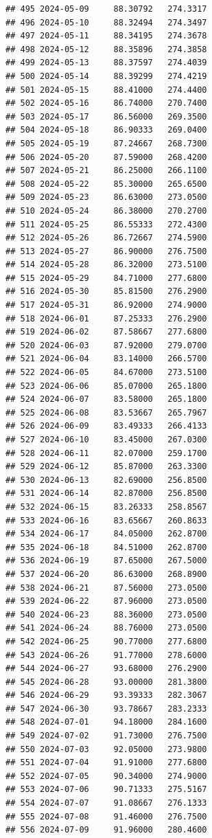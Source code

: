 \documentclass[
]{article}
\begin{document}
\begin{verbatim}
## 495 2024-05-09     88.30792   274.3317
## 496 2024-05-10     88.32494   274.3497
## 497 2024-05-11     88.34195   274.3678
## 498 2024-05-12     88.35896   274.3858
## 499 2024-05-13     88.37597   274.4039
## 500 2024-05-14     88.39299   274.4219
## 501 2024-05-15     88.41000   274.4400
## 502 2024-05-16     86.74000   270.7400
## 503 2024-05-17     86.56000   269.3500
## 504 2024-05-18     86.90333   269.0400
## 505 2024-05-19     87.24667   268.7300
## 506 2024-05-20     87.59000   268.4200
## 507 2024-05-21     86.25000   266.1100
## 508 2024-05-22     85.30000   265.6500
## 509 2024-05-23     86.63000   273.0500
## 510 2024-05-24     86.38000   270.2700
## 511 2024-05-25     86.55333   272.4300
## 512 2024-05-26     86.72667   274.5900
## 513 2024-05-27     86.90000   276.7500
## 514 2024-05-28     86.32000   273.5100
## 515 2024-05-29     84.71000   277.6800
## 516 2024-05-30     85.81500   276.2900
## 517 2024-05-31     86.92000   274.9000
## 518 2024-06-01     87.25333   276.2900
## 519 2024-06-02     87.58667   277.6800
## 520 2024-06-03     87.92000   279.0700
## 521 2024-06-04     83.14000   266.5700
## 522 2024-06-05     84.67000   273.5100
## 523 2024-06-06     85.07000   265.1800
## 524 2024-06-07     83.58000   265.1800
## 525 2024-06-08     83.53667   265.7967
## 526 2024-06-09     83.49333   266.4133
## 527 2024-06-10     83.45000   267.0300
## 528 2024-06-11     82.07000   259.1700
## 529 2024-06-12     85.87000   263.3300
## 530 2024-06-13     82.69000   256.8500
## 531 2024-06-14     82.87000   256.8500
## 532 2024-06-15     83.26333   258.8567
## 533 2024-06-16     83.65667   260.8633
## 534 2024-06-17     84.05000   262.8700
## 535 2024-06-18     84.51000   262.8700
## 536 2024-06-19     87.65000   267.5000
## 537 2024-06-20     86.63000   268.8900
## 538 2024-06-21     87.56000   273.0500
## 539 2024-06-22     87.96000   273.0500
## 540 2024-06-23     88.36000   273.0500
## 541 2024-06-24     88.76000   273.0500
## 542 2024-06-25     90.77000   277.6800
## 543 2024-06-26     91.77000   278.6000
## 544 2024-06-27     93.68000   276.2900
## 545 2024-06-28     93.00000   281.3800
## 546 2024-06-29     93.39333   282.3067
## 547 2024-06-30     93.78667   283.2333
## 548 2024-07-01     94.18000   284.1600
## 549 2024-07-02     91.73000   276.7500
## 550 2024-07-03     92.05000   273.9800
## 551 2024-07-04     91.91000   277.6800
## 552 2024-07-05     90.34000   274.9000
## 553 2024-07-06     90.71333   275.5167
## 554 2024-07-07     91.08667   276.1333
## 555 2024-07-08     91.46000   276.7500
## 556 2024-07-09     91.96000   280.4600

\end{verbatim}
\end{document}
